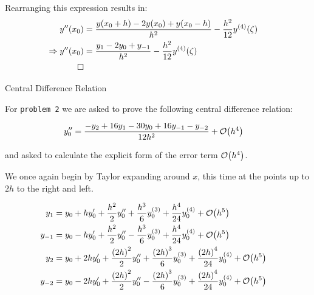 \documentclass[12pt]{article}
\newenvironment{ex}[2][Exercise]{\begin{trivlist}
\item[\hskip \labelsep {\bfseries #1}\hskip \labelsep {\bfseries #2.}]}{\end{trivlist}}
\newenvironment{sol}[1][Solution]{\begin{trivlist}
\item[\hskip \labelsep {\bfseries #1:}]}{\end{trivlist}}
\DeclarePairedDelimiter\rb{(}{)}
\begin{document}
Rearranging this expression results in:
\begin{align*}
	y''\rb*{x_{0}} & =  \frac{y \rb*{x_{0} + h} - 2 y \rb*{ x_{0}} + y \rb*{ x_{0} - h }}{h^{2}}
	- \frac{h^{2} }{12} y^{\rb*{4}} \rb*{\zeta} &\\
	\Rightarrow y'' \rb*{x_{0}} & = 
	\frac{y_{1} - 2 y_{0} + y_{-1}}{h^{2}} 
	- \frac{h^{2}}{12} y ^{\rb*{4}} \rb*{\zeta} &\\
	\Box
\end{align*}

\newpage

\begin{ex}
	2 Central Difference Relation
\end{ex}

For \texttt{problem 2} we are asked to prove the following central difference relation:

\begin{align*}
	y_{0}'' & =  \frac{
		-y_{2} + 16 y_{1} - 30 y_{0} + 16 y_{-1} - y_{-2}
	}{12 h^{2}}
	+ \mathcal{O} \rb*{h^{4}} &\\
\end{align*}

and asked to calculate the explicit form of the error term \(\mathcal{O } \rb*{h^{4}}\).

\begin{sol}  \end{sol}

We once again begin by Taylor expanding around \(x\), this time at the points up to \(2h \) to the right and left.

\begin{align*}
	y_{1} & =  y_{0} + h y_{0}' + \frac{h^{2}}{2} y_{0}''
	+ \frac{h^{3}}{6} y_{0}^{\rb*{3}}
	+ \frac{h^{4}}{24} y_{0}^{\rb*{4}} + \mathcal{O} \rb*{h^{5}} &\\
	y_{-1} & = y_{0} - h y_{0}' + \frac{h^{2}}{2} y_{0}''
	- \frac{h^{3}}{6}y_{0}^{\rb*{3}}
	+ \frac{h^{4}}{24} y_{0}^{\rb*{4}} + \mathcal{O} \rb*{h^{5}} &\\
	y_{2} & =  y_{0} + 2h y_{0}' + \frac{\rb*{2h}^{2}}{2} y_{0}''
	+ \frac{\rb*{2h}^{3}}{6} y_{0}^{\rb*{3}}
	+ \frac{\rb*{2h}^{4}}{24} y_{0}^{\rb*{4} } + \mathcal{O} \rb*{h^{5}} &\\
	y_{-2} & =  y_{0} - 2h y_{0}' + \frac{\rb*{2h}^{2}}{2} y_{0}''
	- \frac{\rb*{2h}^{3}}{6} y_{0}^{\rb*{3}}
	+ \frac{\rb*{2h}^{4}}{24} y_{0}^{\rb*{4} } + \mathcal{O} \rb*{h^{5}} &\\
\end{align*}
\end{document}
